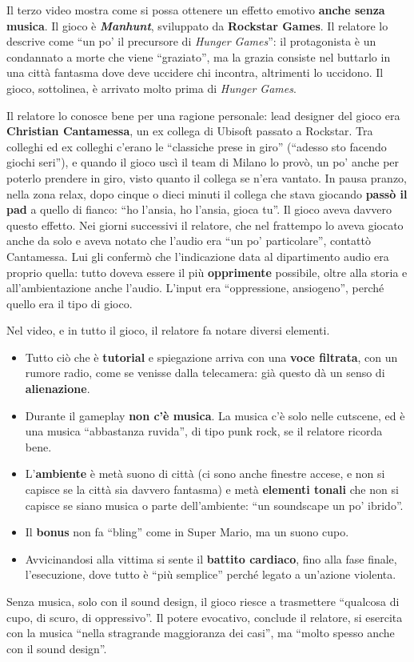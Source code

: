 Il terzo video mostra come si possa ottenere un effetto emotivo \textbf{anche
senza musica}. Il gioco è \textbf{\emph{Manhunt}}, sviluppato da \textbf{Rockstar
Games}. Il relatore lo descrive come ``un po' il precursore di \emph{Hunger
Games}'': il protagonista è un condannato a morte che viene ``graziato'', ma la
grazia consiste nel buttarlo in una città fantasma dove deve uccidere chi
incontra, altrimenti lo uccidono. Il gioco, sottolinea, è arrivato molto prima di
\emph{Hunger Games}.

Il relatore lo conosce bene per una ragione personale: lead designer del gioco
era \textbf{Christian Cantamessa}, un ex collega di Ubisoft passato a Rockstar.
Tra colleghi ed ex colleghi c'erano le ``classiche prese in giro'' (``adesso sto
facendo giochi seri''), e quando il gioco uscì il team di Milano lo provò, un po'
anche per poterlo prendere in giro, visto quanto il collega se n'era vantato. In
pausa pranzo, nella zona relax, dopo cinque o dieci minuti il collega che stava
giocando \textbf{passò il pad} a quello di fianco: ``ho l'ansia, ho l'ansia,
gioca tu''. Il gioco aveva davvero questo effetto. Nei giorni successivi il
relatore, che nel frattempo lo aveva giocato anche da solo e aveva notato che
l'audio era ``un po' particolare'', contattò Cantamessa. Lui gli confermò che
l'indicazione data al dipartimento audio era proprio quella: tutto doveva essere
il più \textbf{opprimente} possibile, oltre alla storia e all'ambientazione
anche l'audio. L'input era ``oppressione, ansiogeno'', perché quello era il tipo
di gioco.

Nel video, e in tutto il gioco, il relatore fa notare diversi elementi.
\begin{itemize}
  \item Tutto ciò che è \textbf{tutorial} e spiegazione arriva con una
        \textbf{voce filtrata}, con un rumore radio, come se venisse dalla
        telecamera: già questo dà un senso di \textbf{alienazione}.
  \item Durante il gameplay \textbf{non c'è musica}. La musica c'è solo nelle
        cutscene, ed è una musica ``abbastanza ruvida'', di tipo punk rock, se il
        relatore ricorda bene.
  \item L'\textbf{ambiente} è metà suono di città (ci sono anche finestre
        accese, e non si capisce se la città sia davvero fantasma) e metà
        \textbf{elementi tonali} che non si capisce se siano musica o parte
        dell'ambiente: ``un soundscape un po' ibrido''.
  \item Il \textbf{bonus} non fa ``bling'' come in Super Mario, ma un suono cupo.
  \item Avvicinandosi alla vittima si sente il \textbf{battito cardiaco}, fino
        alla fase finale, l'esecuzione, dove tutto è ``più semplice'' perché
        legato a un'azione violenta.
\end{itemize}
Senza musica, solo con il sound design, il gioco riesce a trasmettere
``qualcosa di cupo, di scuro, di oppressivo''. Il potere evocativo, conclude il
relatore, si esercita con la musica ``nella stragrande maggioranza dei casi'', ma
``molto spesso anche con il sound design''.


